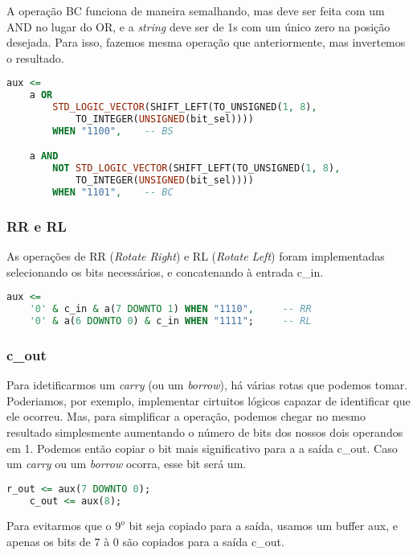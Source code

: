 \documentclass{article}
\begin{document}
A operação BC funciona de maneira semalhando, mas deve ser feita com um AND no lugar do OR, e a \textit{string} deve ser de 1s com um único zero na posição desejada. Para isso, fazemos mesma operação que anteriormente, mas invertemos o resultado.

\begin{lstlisting}[language=VHDL]
aux <=
    a OR
        STD_LOGIC_VECTOR(SHIFT_LEFT(TO_UNSIGNED(1, 8),
            TO_INTEGER(UNSIGNED(bit_sel))))
        WHEN "1100",    -- BS

    a AND
        NOT STD_LOGIC_VECTOR(SHIFT_LEFT(TO_UNSIGNED(1, 8),
            TO_INTEGER(UNSIGNED(bit_sel))))
        WHEN "1101",	-- BC
\end{lstlisting}

\subsubsection{RR e RL}

As operações de RR (\textit{Rotate Right}) e RL (\textit{Rotate Left}) foram implementadas selecionando os bits necessários, e concatenando à entrada c\_in.

\begin{lstlisting}[language=VHDL]
aux <=
    '0' & c_in & a(7 DOWNTO 1) WHEN "1110",     -- RR
    '0' & a(6 DOWNTO 0) & c_in WHEN "1111";     -- RL
\end{lstlisting}

\subsubsection{c\_out}

Para idetificarmos um \textit{carry} (ou um \textit{borrow}), há várias rotas que podemos tomar. Poderiamos, por exemplo, implementar cirtuitos lógicos capazar de identificar que ele ocorreu. Mas, para simplificar a operação, podemos chegar no mesmo resultado simplesmente aumentando o número de bits dos nossos dois operandos em 1. Podemos então copiar o bit mais significativo para a a saída c\_out. Caso um \textit{carry} ou um \textit{borrow} ocorra, esse bit será um.

\begin{lstlisting}[language=VHDL]
    r_out <= aux(7 DOWNTO 0);
    c_out <= aux(8);
\end{lstlisting}

Para evitarmos que o $9^o$ bit seja copiado para a saída, usamos um buffer aux, e apenas os bits de 7 à 0 são copiados para a saída c\_out.
\end{document}
